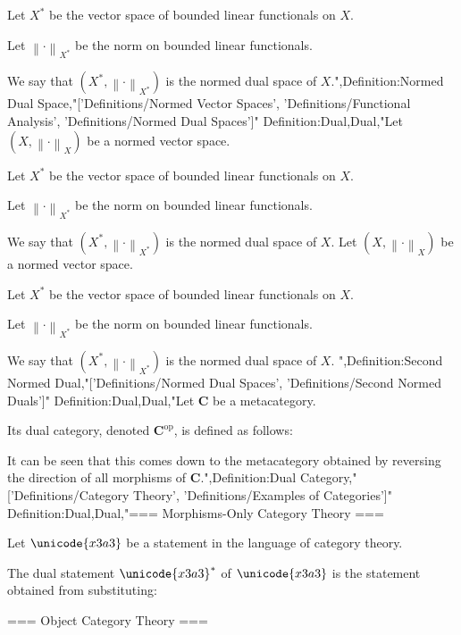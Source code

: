 Let $X^\ast$ be the vector space of bounded linear functionals on $X$. 

Let $\left\lVert \cdot \right\rVert_{X^\ast}$ be the norm on bounded linear functionals.


We say that $\left( X^\ast, \left\lVert \cdot \right\rVert_{X^\ast}  \right)$ is the normed dual space of $X$.",Definition:Normed Dual Space,"['Definitions/Normed Vector Spaces', 'Definitions/Functional Analysis', 'Definitions/Normed Dual Spaces']"
Definition:Dual,Dual,"Let $\left( X, \left\lVert \cdot \right\rVert_X \right)$ be a normed vector space.

Let $X^\ast$ be the vector space of bounded linear functionals on $X$. 

Let $\left\lVert \cdot \right\rVert_{X^\ast}$ be the norm on bounded linear functionals.


We say that $\left( X^\ast, \left\lVert \cdot \right\rVert_{X^\ast}  \right)$ is the normed dual space of $X$.
Let $\left( X, \left\lVert \cdot \right\rVert_X \right)$ be a normed vector space.

Let $X^\ast$ be the vector space of bounded linear functionals on $X$. 

Let $\left\lVert \cdot \right\rVert_{X^\ast}$ be the norm on bounded linear functionals.


We say that $\left( X^\ast, \left\lVert \cdot \right\rVert_{X^\ast}  \right)$ is the normed dual space of $X$.
",Definition:Second Normed Dual,"['Definitions/Normed Dual Spaces', 'Definitions/Second Normed Duals']"
Definition:Dual,Dual,"Let $\mathbf C$ be a metacategory.


Its dual category, denoted $\mathbf C^{\text{op} }$, is defined as follows:



It can be seen that this comes down to the metacategory obtained by reversing the direction of all morphisms of $\mathbf C$.",Definition:Dual Category,"['Definitions/Category Theory', 'Definitions/Examples of Categories']"
Definition:Dual,Dual,"=== Morphisms-Only Category Theory ===

Let $\unicode{x3a3}$ be a statement in the language of category theory.

The dual statement $\unicode{x3a3}^*$ of $\unicode{x3a3}$ is the statement obtained from substituting:








=== Object Category Theory ===


